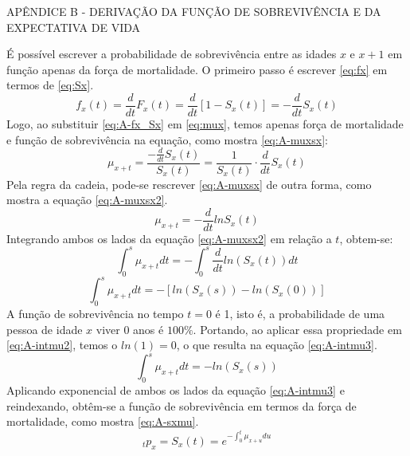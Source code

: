 \newpage



\begin{center}
    APÊNDICE B - DERIVAÇÃO DA FUNÇÃO DE SOBREVIVÊNCIA E DA EXPECTATIVA DE VIDA
\end{center}

\renewcommand{\thechapter}{Apêndice B}  %
\label{apendice_B}

\setcounter{equation}{0}
\renewcommand{\theequation}{B.\arabic{equation}}


É possível escrever a probabilidade de sobrevivência entre as idades $x$ e $x+1$ em função apenas da força de mortalidade. O primeiro passo é escrever \ref{eq:fx} em termos de \ref{eq:Sx}.
\begin{equation}
    f_x(t)=\frac{d}{dt}F_x(t)=\frac{d}{dt}[1-S_x(t)]=-\frac{d}{dt}S_x(t)
    \label{eq:A-fx_Sx}
\end{equation}
Logo, ao substituir \ref{eq:A-fx_Sx} em \ref{eq:mux}, temos apenas força de mortalidade e função de sobrevivência na equação, como mostra \ref{eq:A-muxsx}:
\begin{equation}
    \mu_{x+t} = \frac{-\frac{d}{dt}S_x(t)}{S_x(t)}=\frac{1}{S_x(t)}\cdot\frac{d}{dt}S_x(t)
    \label{eq:A-muxsx}
\end{equation}
Pela regra da cadeia, pode-se rescrever \ref{eq:A-muxsx} de outra forma, como mostra a equação \ref{eq:A-muxsx2}.
\begin{equation}
    \mu_{x+t} = -\frac{d}{dt}lnS_x(t)
    \label{eq:A-muxsx2}
\end{equation}
Integrando ambos os lados da equação \ref{eq:A-muxsx2} em relação a $t$, obtem-se:
\begin{equation}
    \int_0^s\mu_{x+t}dt=-\int_0^s\frac{d}{dt}ln(S_x(t))dt
    \label{eq:A-intmu1}
\end{equation}
\begin{equation}
    \int_0^s\mu_{x+t}dt=-[ln(S_x(s))-ln(S_x(0))]
    \label{eq:A-intmu2}
\end{equation}
A função de sobrevivência no tempo  $t=0$ é 1, isto é, a probabilidade de uma pessoa de idade $x$ viver $0$ anos é $100\%$. Portando, ao aplicar essa propriedade em \ref{eq:A-intmu2}, temos o $ln(1)=0$, o que resulta na equação \ref{eq:A-intmu3}.
\begin{equation}
    \int_0^s\mu_{x+t}dt=-ln(S_x(s))
    \label{eq:A-intmu3}
\end{equation}
Aplicando exponencial de ambos os lados da equação \ref{eq:A-intmu3} e reindexando, obtêm-se a função de sobrevivência em termos da força de mortalidade, como mostra \ref{eq:A-sxmu}.
\begin{equation}
    {}_tp_x=S_x(t)=e^{-\int_0^t\mu_{x+u}du} 
    \label{eq:A-sxmu}
\end{equation}

